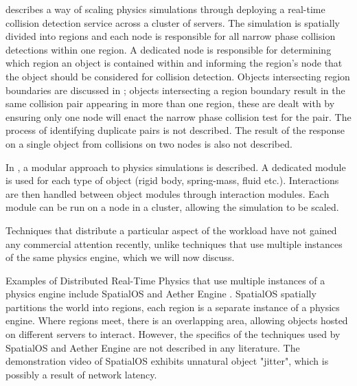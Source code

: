 \cite{Morgan2005} describes a way of scaling physics simulations through deploying a real-time collision detection service across a cluster of servers. The simulation is spatially divided into regions and each node is responsible for all narrow phase collision detections within one region. A dedicated node is responsible for determining which region an object is contained within and informing the region's node that the object should be considered for collision detection.
Objects intersecting region boundaries are discussed in \cite{Morgan2005}; objects intersecting a region boundary result in the same collision pair appearing in more than one region, these are dealt with by ensuring only one node will enact the narrow phase collision test for the pair. The process of identifying duplicate pairs is not described. The result of the response on a single object from collisions on two nodes is also not described.


In \cite{allard2006distributed}, a modular approach to physics simulations is described. A dedicated module is used for each type of object (rigid body, spring-mass, fluid etc.). Interactions are then handled between object modules through interaction modules. Each module can be run on a node in a cluster, allowing the simulation to be scaled.

Techniques that distribute a particular aspect of the workload have not gained any commercial attention recently, unlike techniques that use multiple instances of the same physics engine, which we will now discuss.

Examples of Distributed Real-Time Physics that use multiple instances of a physics engine include SpatialOS \cite{SpatialOS} and Aether Engine \cite{AetherEngine}. SpatialOS spatially partitions the world into regions, each region is a separate instance of a physics engine. Where regions meet, there is an overlapping area, allowing objects hosted on different servers to interact. However, the specifics of the techniques used by SpatialOS and Aether Engine are not described in any literature. The demonstration video of SpatialOS exhibits unnatural object "jitter", which is possibly a result of network latency.

